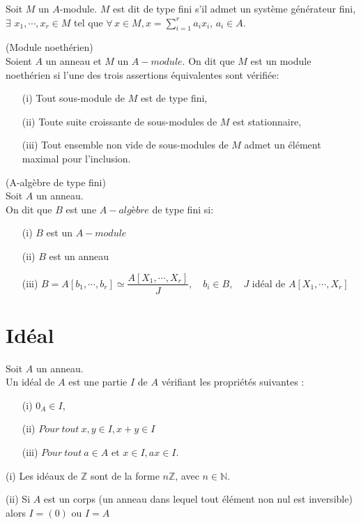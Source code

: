 \begin{madefinition}
	Soit $M$ un $A$-module. $M$ est dit de type fini s'il admet un système générateur fini, $\exists \, \, x_1, \cdots ,x_r \in M$ tel que $\forall \,  x \in M, x = \displaystyle \sum_{i=1}^{r}{a_i x_i}$, $a_i \in A$.
\end{madefinition}
\begin{maproposition}(Module noethérien) \\
	Soient $A$ un anneau et $M$ un $A-module$. On dit que $M$ est un module noethérien si l'une des trois assertions équivalentes sont vérifiée:
	\begin{enumerate}
		\item[(i)] Tout sous-module de $M$ est de type fini,
		\item[(ii)] Toute suite croissante de sous-modules de $M$ est stationnaire,
		\item[(iii)] Tout ensemble non vide de sous-modules de $M$ admet un élément maximal pour l'inclusion.
	\end{enumerate} 
\end{maproposition}
\begin{madefinition}(A-algèbre de type fini)\\
	Soit $A$ un anneau. \\
	On dit que $B$ est une $A-algèbre$ de type fini si:
	\begin{enumerate}
		\item[(i)] $B$ est un $A-module$
		\item[(ii)] $B$ est un anneau
		\item[(iii)] $B = A [b_1, \cdots, b_r] \simeq \dfrac{A[X_1, \cdots, X_r]}{J}, \quad b_i \in B , \quad J$ idéal de $A[X_1, \cdots, X_r]$
	\end{enumerate}
\end{madefinition}
\section{Idéal}
\begin{madefinition}
	Soit $A$ un anneau.\\
	Un idéal de $A$ est une partie $I$ de $A$ vérifiant les propriétés suivantes : \\
	\begin{enumerate}
		\item[(i)] $0_A \in I$,
		\item[(ii)] $ Pour \ tout \ x, y \in I, x+y \in I$
		\item[(iii)] $ Pour \ tout \ a \in A$ et $x \in I , ax \in I$.
	\end{enumerate}
\end{madefinition}
\begin{monexemple}
	\item[(i)] Les idéaux de $\mathbb{Z}$ sont de la forme $n\mathbb{Z}$, avec $n \in \mathbb{N}$.
	\item[(ii)] Si $A$ est un corps (un anneau dans lequel tout élément non nul est inversible) alors $I= (0) $ ou $I=A$
\end{monexemple}
